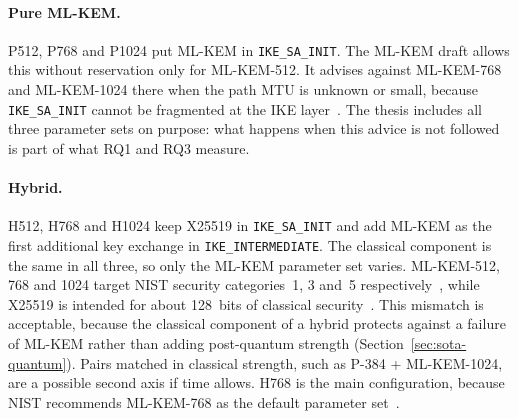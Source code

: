 \paragraph{Pure ML-KEM.}
P512, P768 and P1024 put ML-KEM in \texttt{IKE\_SA\_INIT}. The ML-KEM draft
allows this without reservation only for ML-KEM-512. It advises against
ML-KEM-768 and ML-KEM-1024 there when the path MTU is unknown or small,
because \texttt{IKE\_SA\_INIT} cannot be fragmented at the IKE
layer~\cite{ikev2mlkem}. The thesis includes all three parameter sets on
purpose: what happens when this advice is not followed is part of what RQ1
and RQ3 measure.

\paragraph{Hybrid.}
H512, H768 and H1024 keep X25519 in \texttt{IKE\_SA\_INIT} and add ML-KEM as
the first additional key exchange in \texttt{IKE\_INTERMEDIATE}. The classical
component is the same in all three, so only the ML-KEM parameter set varies.
ML-KEM-512, 768 and 1024 target NIST security categories~1, 3 and~5
respectively~\cite{fips203}, while X25519 is intended for about 128~bits of
classical security~\cite{rfc8031}. This mismatch is acceptable, because the classical component of
a hybrid protects against a failure of ML-KEM rather than adding post-quantum
strength (Section~\ref{sec:sota-quantum}). Pairs matched in classical
strength, such as P-384 + ML-KEM-1024, are a possible second axis if time
allows. H768 is the main configuration, because NIST recommends ML-KEM-768 as
the default parameter set~\cite[Section~8]{fips203}.

